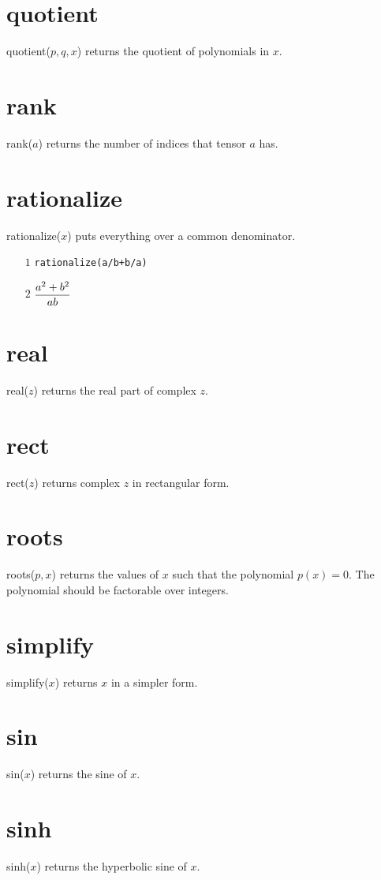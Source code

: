 \documentclass[12pt,openany]{report}
\begin{document}
\section*{quotient}
quotient($p,q,x$) returns the quotient of polynomials in $x$.

\section*{rank}
rank($a$) returns the number of indices that tensor $a$ has.

\section*{rationalize}
rationalize($x$) puts everything over a common denominator.
\begin{itemize}
\item[$\scriptstyle1$]{\tt rationalize(a/b+b/a)}
\item[$\scriptstyle2$]\hspace{50pt} $\displaystyle{a^2+b^2\over ab}$
\end{itemize}

\section*{real}
real($z$) returns the real part of complex $z$.

\section*{rect}
rect($z$) returns complex $z$ in rectangular form.

\section*{roots}
roots($p,x$) returns the values of $x$ such that the polynomial $p(x)=0$.
The polynomial should be factorable over integers.

\section*{simplify}
simplify($x$) returns $x$ in a simpler form.

\section*{sin}
sin($x$) returns the sine of $x$.

\section*{sinh}
sinh($x$) returns the hyperbolic sine of $x$.
\end{document}
